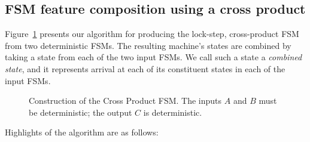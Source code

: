 \documentclass[sigplan,anonymous,review]{acmart}
\begin{document}
\subsection{FSM feature composition using a cross product}\label{sec:cpalg}

Figure~\ref{fig:algo} presents our algorithm for producing the lock-step, cross-product FSM from two deterministic FSMs.  The resulting machine's states are combined by taking a state from each of the two input FSMs.  We call such a state a \emph{combined state}, and it represents arrival at each of its constituent states in each of the input FSMs. 
\begin{figure}[htb]
\renewcommand{\algorithmicrequire}{\textbf{Inputs:}}
\renewcommand{\algorithmicensure}{\textbf{Output:}}
\renewcommand\thealgorithm{}
\begin{algorithmic}[1]

 \hfill{}
 \hfill{}
        \ENDIF
        \ENDIF
    \ENDFOR
\ENDWHILE
\end{algorithmic}
\caption{Construction of the Cross Product FSM.  The inputs $A$ and $B$ must be deterministic;  the output $C$ is deterministic.}\label{fig:algo}
\end{figure}
Highlights of the algorithm are as follows:
\end{document}
